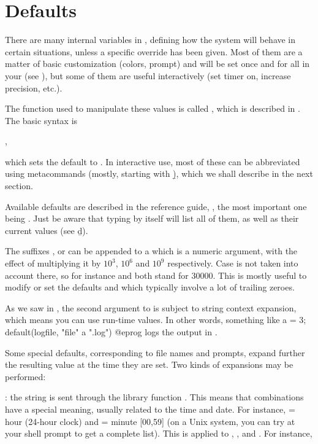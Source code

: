 \section{Defaults}
\label{se:defaults}

\noindent There are many internal variables in , defining how the
system will behave in certain situations, unless a specific override has been
given. Most of them are a matter of basic customization (colors, prompt) and
will be set once and for all in your  (see
), but some of them are useful interactively (set timer on,
increase precision, etc.).

The function used to manipulate these values is called , which
is described in . The basic syntax is

,

\noindent which sets the default  to . In interactive
use, most of these can be abbreviated using  metacommands
(mostly, starting with \b), which we shall describe in the next section.

Available defaults are described in the reference guide,
, the most important one being .
Just be aware that typing  by itself will list all of them, as
well as their current values (see \b{d}).

 The suffixes ,  or  can be appended to
a  which is a numeric argument, with the effect of multiplying it
by $10^3$, $10^6$ and $10^9$ respectively. Case is not taken into account
there, so for instance  and  both stand for $30000$. This
is mostly useful to modify or set the defaults  and
 which typically involve a lot of trailing zeroes.

 As we saw in ,
the second argument to  is subject to string context
expansion, which means you can use run-time values. In other words, something
like
\bprog
  a = 3;
  default(logfile, "file" a ".log")
@eprog
logs the output in .

Some special defaults, corresponding to file names and prompts, expand further
the resulting value at the time they are set. Two kinds of expansions may be
performed:

\item {}: the string is sent through the library
function . This means that \kbd{\%} combinations have
a special meaning, usually related to the time and date. For instance,
 = hour (24-hour clock) and  = minute [00,59] (on a Unix
system, you can try  at your shell prompt to get a complete
list). This is applied to , , and . For
instance,

